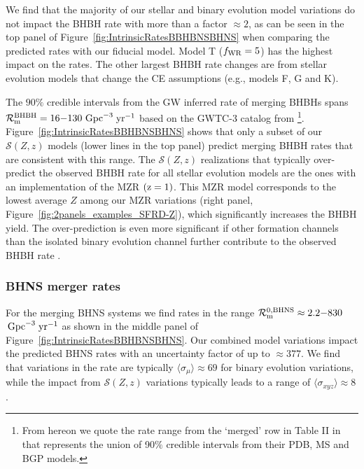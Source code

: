 \documentclass[fleqn,usenatbib]{mnras}
\newcommand\rate{\mathcal{R}}
\newcommand{\Zi}{\ensuremath{Z}\xspace}
\newcommand{\yearmin}{\ensuremath{\,\rm{yr}^{-1}}\xspace}
\newcommand{\GpcminThree}{\ensuremath{\,\rm{Gpc}^{-3}}\xspace}
\newcommand{\SFRD}{\ensuremath{\mathcal{S}(Z,z)}\xspace}
\newcommand{\RateIntrinsicAzeroBHNSmin}{\ensuremath{2.2}\xspace}  %
\newcommand{\RateIntrinsicAzeroBHNSmax}{\ensuremath{830}\xspace} %
\newcommand{\RateGWTCmaxBHBH}{\ensuremath{130}\xspace}
\newcommand{\RateGWTCminBHBH}{\ensuremath{16}\xspace}
\begin{document}
We find that the majority of our stellar and binary evolution model variations do not impact the \ac{BHBH} rate with more than a factor $\approx 2$, as can be seen in the top panel of Figure~\ref{fig:IntrinsicRatesBBHBNSBHNS} when comparing the predicted rates with our fiducial model. Model T ($f_{\rm{WR}}=5$) has the highest impact on the rates. The other largest \ac{BHBH} rate changes are from stellar evolution models that change the \ac{CE} assumptions (e.g., models F, G and K). 

The $90\%$ credible intervals from the \ac{GW} inferred rate of merging \acp{BHBH} spans $\rate_{\rm{m}}^{\rm{BHBH}} =  \RateGWTCminBHBH{-}\RateGWTCmaxBHBH$\GpcminThree\yearmin based on the {GWTC-3} catalog from \citet{Abbott:2021GWTC3pop}\footnote{From hereon we quote the rate range from the `merged' row in Table II in \citet{Abbott:2021GWTC3pop} that represents the union of 90$\%$ credible intervals from their PDB, MS and BGP models.}.  
Figure~\ref{fig:IntrinsicRatesBBHBNSBHNS} shows that only a subset  of our \SFRD models (lower lines in the top panel) predict merging \ac{BHBH}  rates that are consistent with this range. 
%
The \SFRD realizations that typically over-predict the observed \ac{BHBH} rate for all stellar evolution models are the ones with an implementation of the \citet{2006ApJ...638L..63L} \ac{MZR} $(\rm{z}=1)$. This \ac{MZR} model corresponds to the lowest average \Zi  among our \ac{MZR} variations (right panel, Figure~\ref{fig:2panels_examples_SFRD-Z}), which significantly increases the \ac{BHBH} yield. The over-prediction is even more significant if other formation channels than the isolated binary evolution channel further contribute to the observed \ac{BHBH} rate \citep[e.g.,][]{Abbott:2021GWTC2pop,Zevin:2021-branching-ratios}. 


\subsubsection{BHNS merger rates}
\label{subsec:intrinsic-merger-rates-BHNS}

For the merging \ac{BHNS} systems we find rates in the range $\rate_{\rm{m}}^{0,\rm{BHNS}} \approx  \RateIntrinsicAzeroBHNSmin{-}\RateIntrinsicAzeroBHNSmax$\GpcminThree \yearmin as shown in the middle panel of Figure~\ref{fig:IntrinsicRatesBBHBNSBHNS}.   Our combined model variations impact the predicted \ac{BHNS} rates with an uncertainty factor of up to $\approx 377$. We find that variations in the rate are typically $\langle \sigma_{\mu} \rangle \approx 69$ for binary evolution variations, while the impact from \SFRD variations typically leads to a range of $\langle \sigma_{xyz}\rangle\approx 8$. 
\end{document}
